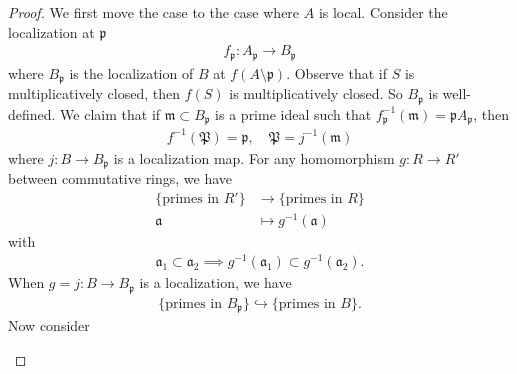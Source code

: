 \documentclass[12pt]{report}
\theoremstyle{plain}
\theoremstyle{remark}
\theoremstyle{definition}
\begin{document}
\begin{proof}
    We first move the case to the case where $A$ is local. Consider the localization at $\mathfrak{p}$
    \begin{align*}
        f_\mathfrak{p}:A_\mathfrak{p}\to B_\mathfrak{p}
    \end{align*}
    where $B_\mathfrak{p}$ is the localization of $B$ at $f(A\setminus \mathfrak{p})$. Observe that if $S$ is multiplicatively closed, then $f(S)$ is multiplicatively closed. So $B_\mathfrak{p}$ is well-defined. We claim that if $\mathfrak{m}\subset B_\mathfrak{p}$ is a prime ideal such that $f_\mathfrak{p}^{-1}(\mathfrak{m})=\mathfrak{p}A_\mathfrak{p}$, then
    \begin{align*}
        f^{-1}(\mathfrak{P})=\mathfrak{p},\quad \mathfrak{P}=j^{-1}(\mathfrak{m})
    \end{align*}
     where $j:B\to B_\mathfrak{p}$ is a localization map. For any homomorphism $g:R\to R'$ between commutative rings, we have
     \begin{align*}
         \{\text{primes in }R'\} &\to \{\text{primes in }R\} \\
         \mathfrak{a} &\mapsto g^{-1}(\mathfrak{a})
     \end{align*}
     with
     \begin{align*}
         \mathfrak{a}_1\subset \mathfrak{a}_2\implies g^{-1}(\mathfrak{a}_1)\subset g^{-1}(\mathfrak{a}_2).
     \end{align*}
     When $g=j:B\to B_\mathfrak{p}$ is a localization, we have
     \begin{align*}
         \{\text{primes in }B_\mathfrak{p}\} \hookrightarrow \{\text{primes in }B\}.
     \end{align*}
     Now consider
     \begin{figure}[H]
         \centering
     \end{figure}

\end{proof}
\end{document}
